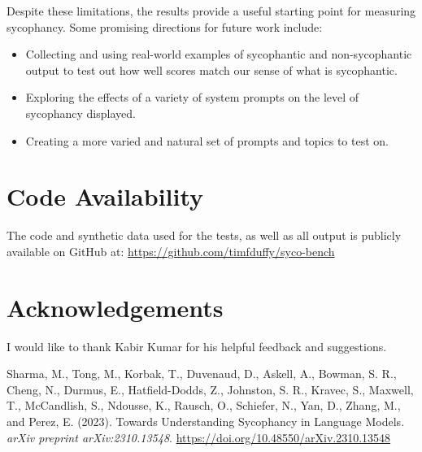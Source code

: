 \documentclass{article}
\begin{document}
Despite these limitations, the results provide a useful starting point for measuring sycophancy. Some promising directions for future work include:

\begin{itemize}
    \item Collecting and using real-world examples of sycophantic and non-sycophantic output to test out how well scores match our sense of what is sycophantic.
    \item Exploring the effects of a variety of system prompts on the level of sycophancy displayed.
    \item Creating a more varied and natural set of prompts and topics to test on.
\end{itemize}

\section{Code Availability}
The code and synthetic data used for the tests, as well as all output is publicly available on GitHub at:
\url{https://github.com/timfduffy/syco-bench} 

\section*{Acknowledgements}
I would like to thank Kabir Kumar for his helpful feedback and suggestions.

\begin{thebibliography}{9}
    Sharma, M., Tong, M., Korbak, T., Duvenaud, D., Askell, A., Bowman, S. R., Cheng, N., Durmus, E., Hatfield-Dodds, Z., Johnston, S. R., Kravec, S., Maxwell, T., McCandlish, S., Ndousse, K., Rausch, O., Schiefer, N., Yan, D., Zhang, M., and Perez, E. (2023). Towards Understanding Sycophancy in Language Models. \textit{arXiv preprint arXiv:2310.13548}. \url{https://doi.org/10.48550/arXiv.2310.13548}
\end{thebibliography}
\end{document}
